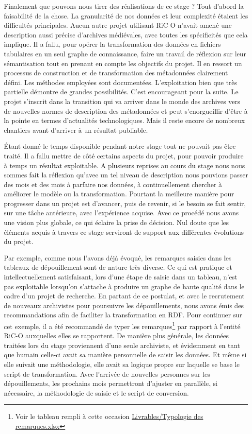 Finalement que pouvons nous tirer des réalisations de ce stage ? Tout d'abord la faisabilité de la chose. La granularité de nos données et leur complexité étaient les difficultés principales. Aucun autre projet utilisant RiC-O n'avait amené une description aussi précise d'archives médiévales, avec toutes les spécificités que cela implique. Il a fallu, pour opérer la transformation des données en fichiers tabulaires en un seul graphe de connaissance, faire un travail de réflexion sur leur sémantisation tout en prenant en compte les objectifs du projet. Il en ressort un processus de construction et de transformation des métadonnées clairement défini. Les méthodes employées sont documentées. L'exploitation bien que très partielle démontre de grandes possibilités. C'est encourageant pour la suite. Le projet s'inscrit dans la transition qui va arriver dans le monde des archives vers de nouvelles normes de description des métadonnées et peut s'enorgueillir d'être à la pointe en termes d'actualités technologiques. Mais il reste encore de nombreux chantiers avant d'arriver à un résultat publiable.
\par
Étant donné le temps disponible pendant notre stage tout ne pouvait pas être traité. Il a fallu mettre de côté certains aspects du projet, pour pouvoir produire à temps un résultat exploitable. A plusieurs reprises au cours du stage nous nous sommes fait la réflexion qu'avec un tel niveau de description nous pouvions passer des mois et des mois à parfaire nos données, à continuellement chercher à améliorer le modèle ou la transformation. Pourtant la meilleure manière pour progresser dans un projet est d'avancer, puis de revenir, si le besoin se fait sentir, sur une tâche antérieure, avec l'expérience acquise. Avec ce procédé nous avons une vision plus globale, ce qui éclaire la prise de décision. Nul doute que les éléments acquis à travers ce stage serviront de support aux différentes évolutions du projet.
\par
Par exemple, comme nous l'avons déjà évoqué, les remarques saisies dans les tableaux de dépouillement sont de nature très diverse. Ce qui est pratique et intellectuellement satisfaisant, lors d'une étape de saisie dans un tableau, n'est pas exploitable lorsqu'on s'attache à produire un graphe de haute qualité dans le cadre d'un projet de recherche. En partant de ce postulat, et avec le recrutement de nouveaux archivistes pour poursuivre les dépouillements, nous avons émis des recommandations afin de faciliter la transformation en RDF. Pour continuer sur cet exemple, il a été recommandé de typer les remarques\footnote{Voir le tableau rempli à cette occasion \href{https://github.com/Florian-Langele/Memoire-de-stage-TNAH/blob/main/Livrables/Typologie\%20des\%20remarques.xlsx}{Livrables/Typologie des remarques.xlsx}} par rapport à l'entité RiC-O auxquelles elles se rapportent. De manière plus générale, les données traitées lors du stage proviennent d'une seule archiviste, et évidemment en tant que humain celle-ci avait sa manière personnelle de saisir les données. Et même si elle suivait une méthodologie, elle avait sa logique propre sur laquelle se base le script de transformation. Avec l'arrivée de nouvelles personnes sur les dépouillements, les prochains mois permettront d'ajuster en parallèle, si nécessaire,  la méthodologie de saisie et le script de conversion.
